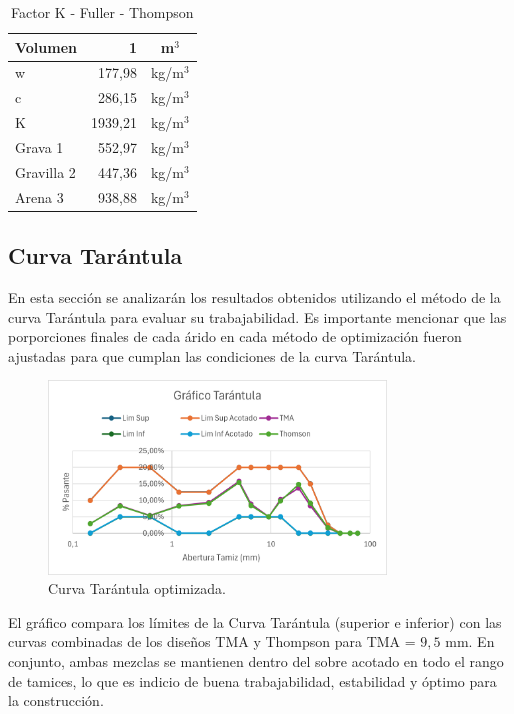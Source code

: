 \begin{table}[H]
\centering
\caption{Factor K - Fuller - Thompson}
\label{tab:factor-k-thomson}
\setlength{\tabcolsep}{6pt}
\renewcommand{\arraystretch}{1.15}
\small
\begin{tabular}{|l|r|c|}
\hline
\textbf{Volumen} & \textbf{1} & \textbf{m$^{3}$} \\ \hline
w          & 177,98     & kg/m$^{3}$ \\ \hline
c          & 286,15  & kg/m$^{3}$ \\ \hline
K          & 1939,21  & kg/m$^{3}$ \\ \hline
Grava 1    & 552,97  & kg/m$^{3}$ \\ \hline
Gravilla 2 & 447,36  & kg/m$^{3}$ \\ \hline
Arena 3    & 938,88  & kg/m$^{3}$ \\ \hline
\end{tabular}
\end{table}

\subsection{Curva Tarántula}

En esta sección se analizarán los resultados obtenidos utilizando el método de la curva Tarántula para evaluar su trabajabilidad. Es importante mencionar que las porporciones finales de cada árido en cada método de optimización fueron ajustadas para que cumplan las condiciones de la curva Tarántula.

\begin{figure}[H]
    \centering
    \includegraphics[width=0.8\textwidth]{GRAFICOS/tarantula.png}
    \caption{Curva Tarántula optimizada.}
\end{figure}


El gráfico compara los límites de la Curva Tarántula (superior e inferior) con las curvas combinadas de los diseños TMA y Thompson para TMA = \(9{,}5\) mm. En conjunto, ambas mezclas se mantienen dentro del sobre acotado en todo el rango de tamices, lo que es indicio de buena trabajabilidad, estabilidad y óptimo para la construcción.

